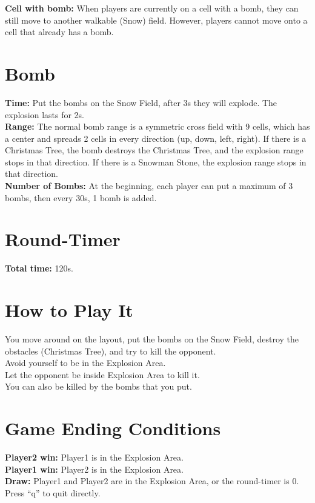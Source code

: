\documentclass[12pt]{article}
\begin{document}
\indent \textbf{Cell with bomb:} When players are currently on a cell with a bomb, they can still move to another walkable (Snow) field. However, players cannot move onto a cell that already has a bomb.

\section*{Bomb}
\hspace{1.27cm}\textbf{Time:} Put the bombs on the Snow Field, after 3s they will explode. The explosion lasts for 2s. \\
\indent \textbf{Range:} The normal bomb range is a symmetric cross field with 9 cells, which has a center and spreads 2 cells in every direction (up, down, left, right). If there is a Christmas Tree, the bomb destroys the Christmas Tree, and the explosion range stops in that direction. If there is a Snowman Stone, the explosion range stops in that direction. \\
\indent \textbf{Number of Bombs:} At the beginning, each player can put a maximum of 3 bombs, then every 30s, 1 bomb is added.

\section*{Round-Timer}
\hspace{1.27cm}\textbf{Total time:} 120s.

\section*{How to Play It}
\hspace{1.27cm} You move around on the layout, put the bombs on the Snow Field, destroy the obstacles (Christmas Tree), and try to kill the opponent. \\
\indent Avoid yourself to be in the Explosion Area. \\
\indent Let the opponent be inside Explosion Area to kill it. \\
\indent You can also be killed by the bombs that you put.

\section*{Game Ending Conditions}
\hspace{1.27cm}\textbf{Player2 win:} Player1 is in the Explosion Area. \\
\indent \textbf{Player1 win:} Player2 is in the Explosion Area. \\
\indent \textbf{Draw:} Player1 and Player2 are in the Explosion Area, or the round-timer is 0. \\
\indent Press ``q'' to quit directly.
\end{document}
